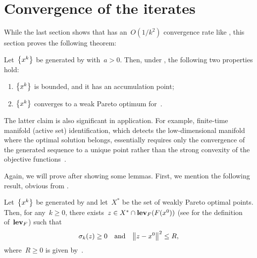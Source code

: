 \documentclass[../main]{subfiles}
\begin{document}
\section{Convergence of the iterates} 
While the last section shows that  has an~$O(1 / k^2)$ convergence rate like , this section proves the following theorem:
\begin{theorem} 
    Let~$\set*{x^k}$ be generated by  with~$a > 0$.
    Then, under , the following two properties hold:
    \begin{enumerate}
        \item {} $\set*{x^k}$ is bounded, and it has an accumulation point;
        \item {} $\set*{x^k}$ converges to a weak Pareto optimum for~.
    \end{enumerate}
\end{theorem}
The latter claim is also significant in application.
For example, finite-time manifold (active set) identification, which detects the low-dimensional manifold where the optimal solution belongs, essentially requires only the convergence of the generated sequence to a unique point rather than the strong convexity of the objective functions~\cite{Sun2019}.

Again, we will prove  after showing some lemmas.
First, we mention the following result, obvious from .
\begin{lemma} 
    Let~$\set*{x^k}$ be generated by  and let~$X^\ast$ be the set of weakly Pareto optimal points.
    Then, for any~$k \ge 0$, there exists~$z \in X^\ast \cap \level_F(F(x^0))$ (see  for the definition of~$\level_F$) such that
    \begin{equation}
        \sigma_k(z) \ge 0 \eqand \norm*{z - x^0}^2 \le R
    ,\end{equation} 
    where~$R \ge 0$ is given by~.
\end{lemma}
\end{document}
